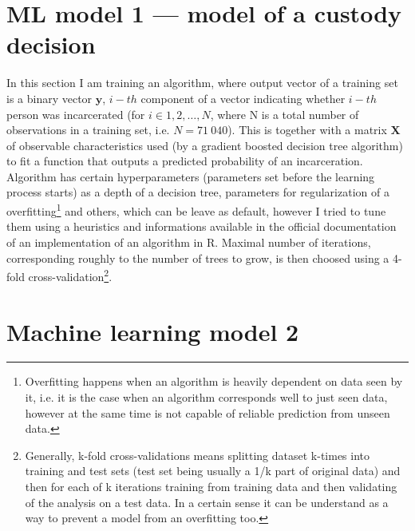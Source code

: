 \documentclass[12pt, twoside]{book} %
\begin{document}
\section{ML model 1 — model of a custody decision}   %
In this section I am training an algorithm, where output vector of a training set is a binary vector $\mathbf{y}$, $i-th$ component of a vector indicating whether $i-th$ person was incarcerated (for $i \in 1, 2, \ldots, N$, where N is a total number of observations in a training set, i.e. $N=71~040$). This is together with a matrix $\mathbf{X}$ of observable characteristics used (by a gradient boosted decision tree algorithm) to fit a function that outputs a predicted probability of an incarceration. Algorithm has certain hyperparameters (parameters set before the learning process starts) as a depth of a decision tree, parameters for regularization of a overfitting\footnote{Overfitting happens when an algorithm is heavily dependent on data seen by it, i.e. it is the case when an algorithm corresponds well to just seen data, however at the same time is not capable of reliable prediction from unseen data.} and others, which can be leave as default, however I tried to tune them using a heuristics and informations available in the official documentation of an implementation of an algorithm in R. Maximal number of iterations, corresponding roughly to the number of trees to grow, is then choosed using a 4-fold cross-validation\footnote{Generally, k-fold cross-validations means splitting dataset k-times into training and test sets (test set being usually a 1/k part of original data) and then for each of k iterations training from training data and then validating of the analysis on a test data. In a certain sense it can be understand as a way to prevent a model from an overfitting too.}.\newline









\section{Machine learning model 2}     %
\end{document}
